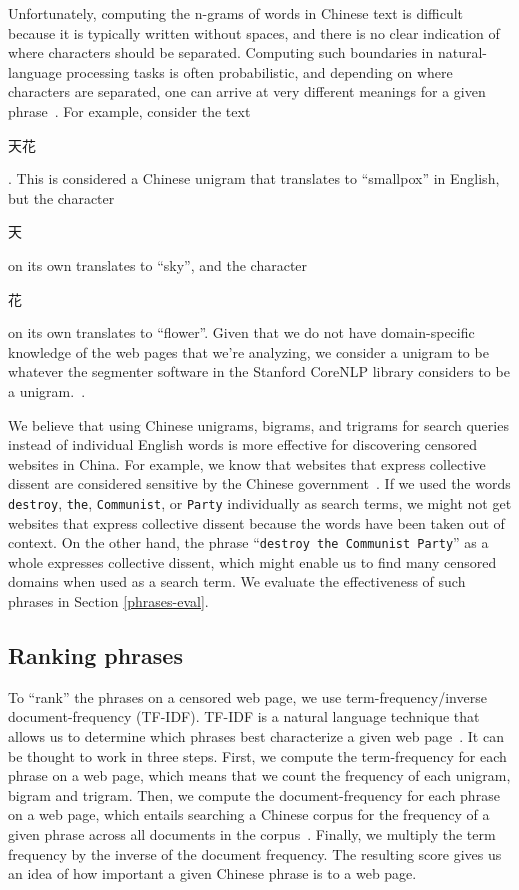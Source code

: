 Unfortunately, computing the n-grams of words in Chinese text is
difficult because it is typically written without spaces, and there is
no clear indication of where characters should be separated. Computing
such boundaries in natural-language processing tasks is often
probabilistic, and depending on where characters are separated, one
can arrive at very different meanings for a given
phrase~\cite{stanford:segmenter}. For example, consider the
text \begin{CJK*}{UTF8}{gbsn}天花\end{CJK*}. This is considered a
Chinese unigram that translates to
``smallpox'' in English, but the character \begin{CJK*}{UTF8}{gbsn}
天\end{CJK*} on its own translates to ``sky'', and the
character \begin{CJK*}{UTF8}{gbsn}花\end{CJK*} on its own translates
to ``flower''. Given that we do not have domain-specific knowledge of
the web pages that we're analyzing, we consider a unigram to be
whatever the segmenter software in the Stanford CoreNLP library considers to be
a unigram.~\cite{tseng2005conditional, chang2008optimizing}.

We believe that using Chinese unigrams, bigrams, and trigrams for search queries
instead of individual English words is more effective for discovering
censored websites in China. For example, we know that websites that
express collective dissent are considered sensitive by the Chinese
government~\cite{king2013censorship}. If we used the words
\texttt{destroy}, \texttt{the}, \texttt{Communist}, or \texttt{Party}
individually as search terms, we might not get websites that express
collective dissent because the words have been taken out of
context. On the other hand, the phrase ``\texttt{destroy the Communist
Party}'' as a whole expresses collective dissent, which might enable us
to find many censored domains when used as a search term. We evaluate
the effectiveness of such phrases in Section \ref{phrases-eval}.

\subsection{Ranking phrases} \label{tf-idf}
To ``rank'' the phrases on a censored web page, we use
term-frequency/inverse document-frequency (TF-IDF). TF-IDF is a
natural language technique that allows us to determine which phrases
best characterize a given web page~\cite{ramos2003using}. It can be
thought to work in three steps. First, we compute the term-frequency
for each phrase on a web page, which means that we count the frequency
of each unigram, bigram and trigram. Then, we compute the document-frequency
for each phrase on a web page, which entails searching a Chinese corpus
for the frequency of a given phrase across all documents in the
corpus~\cite{phrasefinder}. Finally, we multiply the term frequency by
the inverse of the document frequency. The resulting score gives us an
idea of how important a given Chinese phrase is to a web page.

